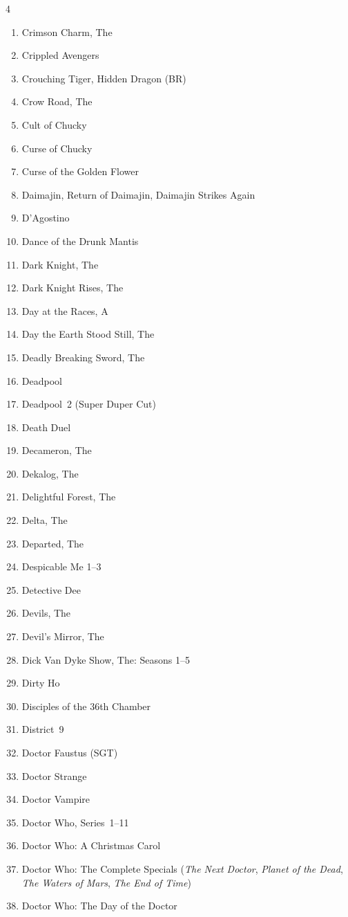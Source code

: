 \documentclass{article}
\begin{document}
\begin{multicols}{4}
\begin{enumerate}
\item Crimson Charm, The
\item Crippled Avengers
\item Crouching Tiger, Hidden Dragon (BR)
\item Crow Road, The
\item Cult of Chucky
\item Curse of Chucky
\item Curse of the Golden Flower
\item Daimajin, Return of Daimajin, Daimajin Strikes Again
\item D'Agostino
\item Dance of the Drunk Mantis
\item Dark Knight, The
\item Dark Knight Rises, The
\item Day at the Races, A
\item Day the Earth Stood Still, The
\item Deadly Breaking Sword, The
\item Deadpool
\item Deadpool~2 (Super Duper Cut)
\item Death Duel
\item Decameron, The
\item Dekalog, The
\item Delightful Forest, The
\item Delta, The
\item Departed, The
\item Despicable Me 1--3
\item Detective Dee
\item Devils, The
\item Devil's Mirror, The
\item Dick Van Dyke Show, The: Seasons 1--5
\item Dirty Ho
\item Disciples of the 36th Chamber
\item District~9
\item Doctor Faustus (SGT)
\item Doctor Strange
\item Doctor Vampire
\item Doctor Who, Series~1--11
\item Doctor Who: A Christmas Carol
\item Doctor Who: The Complete Specials (\emph{The Next Doctor},
  \emph{Planet of the Dead}, \emph{The Waters of Mars}, \emph{The End
    of Time})
\item Doctor Who: The Day of the Doctor

\end{enumerate}
\end{multicols}
\end{document}
